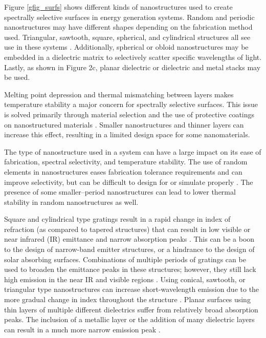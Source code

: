 \documentclass[review]{elsarticle}
\begin{document}
Figure \ref{gfig_surfs} shows different kinds of nanostructures used to create spectrally selective surfaces in energy generation systems.  Random and periodic nanostructures may have different shapes depending on the fabrication method used.  Triangular, sawtooth, square, spherical, and cylindrical structures all see use in these systems \cite{global_opt,paper2_ref6,RF_OptExp_2009}.  Additionally, spherical or obloid nanostructures may be embedded in a dielectric matrix to selectively scatter specific wavelengths of light.  Lastly, as shown in Figure 2c, planar dielectric or dielectric and metal stacks may be used.

Melting point depression and thermal mismatching between layers makes temperature stability a major concern for spectrally selective surfaces.  This issue is solved primarily through material selection and the use of protective coatings on nanostructured materials \cite{paper1_ref5}.  Smaller nanostructures and thinner layers can increase this effect, resulting in a limited design space for some nanomaterials.

The type of nanostructure used in a system can have a large impact on its ease of fabrication, spectral selectivity, and temperature stability.  The use of random elements in nanostructures eases fabrication tolerance requirements and can improve selectivity, but can be difficult to design for or simulate properly \cite{me1}.  The presence of some smaller--period nanostructures can lead to lower thermal stability in random nanostructures as well. 

Square and cylindrical type gratings result in a rapid change in index of refraction (as compared to tapered structures) that can result in low visible or near infrared (IR) emittance and narrow absorption peaks \cite{paper1_ref6,paper2_ref13}.  This can be a boon to the design of narrow-band emitter structures, or a hindrance to the design of solar absorbing surfaces.  Combinations of multiple periods of gratings can be used to broaden the emittance peaks in these structures; however, they still lack high emission in the near IR and visible regions \cite{paper2_ref14}.  Using conical, sawtooth, or triangular type nanostructures can increase short-wavelength emission due to the more gradual change in index throughout the structure \cite{Grann_JOSA,me2}.
Planar surfaces using thin layers of multiple different dielectrics suffer from relatively broad absorption peaks.  The inclusion of a metallic layer or the addition of many dielectric layers can result in a much more narrow emission peak \cite{RF_OptExp_2009}.  
\end{document}
